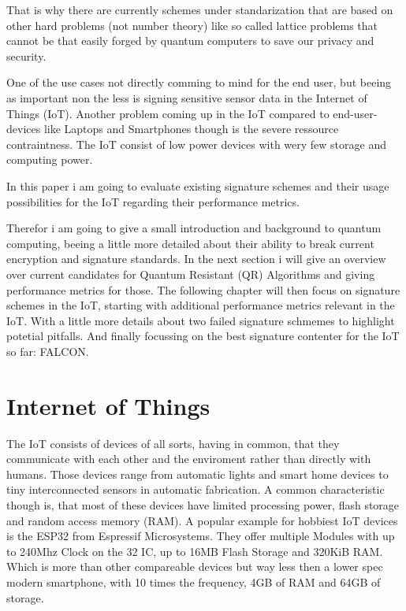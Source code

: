\documentclass[conference]{IEEEtran}
\newcommand{\comment}[1]{}
\begin{document}
That is why there are currently schemes under standarization\cite{PQClean-GH} that are based on other hard problems (not number theory) like so called lattice problems that cannot be that easily forged by quantum computers to save our privacy and security.

One of the use cases not directly comming to mind for the end user, but beeing as important non the less is signing sensitive sensor data in the Internet of Things (IoT).
Another problem coming up in the IoT compared to end-user-devices like Laptops and Smartphones though is the severe ressource contraintness. 
The IoT consist of low power devices with wery few storage and computing power.

In this paper i am going to evaluate existing signature schemes and their usage possibilities for the IoT regarding their performance metrics.

Therefor i am going to give a small introduction and background to quantum computing, beeing a little more detailed about their ability to break current encryption and signature standards.
In the next section i will give an overview over current candidates for Quantum Resistant (QR) Algorithms and giving performance metrics for those.
The following chapter will then focus on signature schemes in the IoT, starting with additional performance metrics relevant in the IoT.
With a little more details about two failed signature schmemes to highlight potetial pitfalls. 
And finally focussing on the best signature contenter for the IoT so far: FALCON.


\section{Internet of Things}
\comment{ %
- growing: over 3 billion rn \cite{QR_IoT}
} %

The IoT consists of devices of all sorts, having in common, that they communicate with each other and the enviroment rather than directly with humans.
Those devices range from automatic lights and smart home devices to tiny interconnected sensors in automatic fabrication.
A common characteristic though is, that most of these devices have limited processing power, flash storage and random access memory (RAM). 
A popular example for hobbiest IoT devices is the ESP32 from Espressif Microsystems.
They offer multiple Modules with up to 240Mhz Clock on the 32 IC, up to 16MB Flash Storage and 320KiB RAM.
Which is more than other compareable devices but way less then a lower spec modern smartphone, with 10 times the frequency, 4GB of RAM and 64GB of storage.
\end{document}

